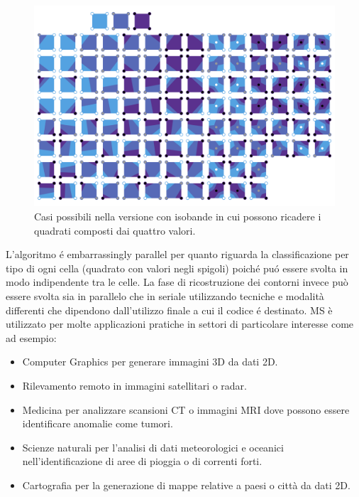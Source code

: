 \documentclass[12pt,a4paper]{report}
\begin{document}
\begin{figure}[H]
    \centering
    \includegraphics[scale=0.17]{img/Marching_squares_isobands.svg.png}
    \caption{Casi possibili nella versione con isobande in cui possono ricadere i quadrati composti dai quattro valori.}
\end{figure}

L'algoritmo é embarrassingly parallel per quanto riguarda la classificazione per tipo di ogni cella (quadrato con valori negli spigoli) poiché puó essere svolta in modo indipendente tra le celle. \newline
La fase di ricostruzione dei contorni invece può essere svolta sia in parallelo che in seriale utilizzando tecniche e modalità differenti che dipendono dall'utilizzo finale a cui il codice é destinato. \newline
MS è utilizzato per molte applicazioni pratiche in settori di particolare interesse come ad esempio:
\begin{itemize}
\item Computer Graphics per generare immagini 3D da dati 2D.
\item Rilevamento remoto in immagini satellitari o radar.
\item Medicina per analizzare scansioni CT o immagini MRI dove possono essere identificare anomalie come tumori.
\item Scienze naturali per l'analisi di dati meteorologici e oceanici nell'identificazione di aree di pioggia o di correnti forti.
\item Cartografia per la generazione di mappe relative a paesi o città da dati 2D.
\end{itemize}
\end{document}
